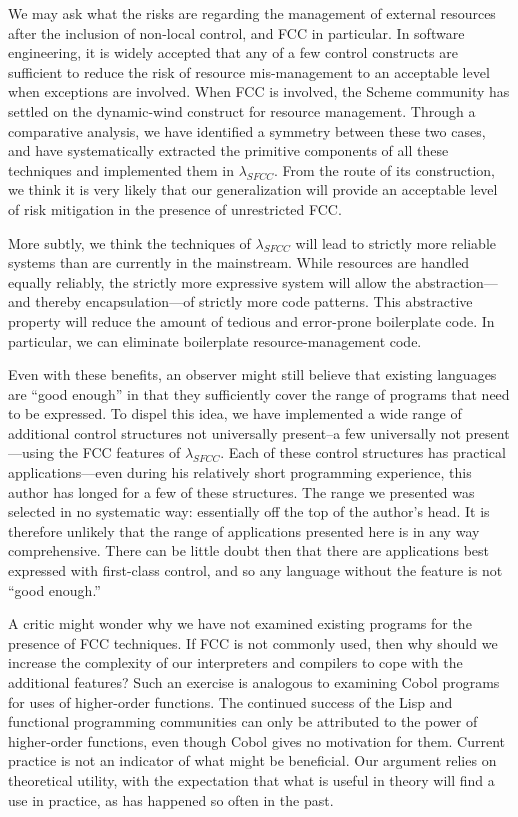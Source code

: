 \documentclass[11pt]{article}
\begin{document}
We may ask what the risks are regarding the management of external resources after the inclusion of non-local control, and FCC in particular.
In software engineering, it is widely accepted that any of a few control constructs are sufficient to reduce the risk of resource mis-management to an acceptable level when exceptions are involved.
When FCC is involved, the Scheme community has settled on the dynamic-wind construct for resource management.
Through a comparative analysis, we have identified a symmetry between  these two cases, and have systematically extracted the primitive components of all these techniques and implemented them in $\lambda_{SFCC}$.
From the route of its construction, we think it is very likely that our generalization will provide an acceptable level of risk mitigation in the presence of unrestricted FCC.

More subtly, we think the techniques of $\lambda_{SFCC}$ will lead to strictly more reliable systems than are currently in the mainstream.
While resources are handled equally reliably, the strictly more expressive system will allow the abstraction---and thereby encapsulation---of strictly more code patterns.
This abstractive property will reduce the amount of tedious and error-prone boilerplate code.
In particular, we can eliminate boilerplate resource-management code.

Even with these benefits, an observer might still believe that existing languages are ``good enough'' in that they sufficiently cover the range of programs that need to be expressed.
To dispel this idea, we have implemented a wide range of additional control structures not universally present--a few universally not present---using the FCC features of $\lambda_{SFCC}$.
Each of these control structures has practical applications---even during his relatively short programming experience, this author has longed for a few of these structures.
The range we presented was selected in no systematic way: essentially off the top of the author's head.
It is therefore unlikely that the range of applications presented here is in any way comprehensive.
There can be little doubt then that there are applications best expressed with first-class control, and so any language without the feature is not ``good enough.''

A critic might wonder why we have not examined existing programs for the presence of FCC techniques.
If FCC is not commonly used, then why should we increase the complexity of our interpreters and compilers to cope with the additional features?
Such an exercise is analogous to examining Cobol programs for uses of higher-order functions.
The continued success of the Lisp and functional programming communities can only be attributed to the power of higher-order functions, even though Cobol gives no motivation for them.
Current practice is not an indicator of what might be beneficial.
Our argument relies on theoretical utility, with the expectation that what is useful in theory will find a use in practice, as has happened so often in the past.
\end{document}
